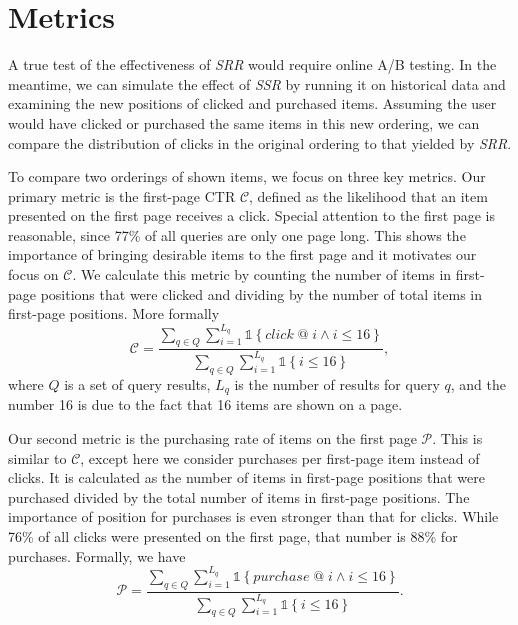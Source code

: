 \documentclass{article}
\begin{document}
\section{Metrics}

A true test of the effectiveness of {\em SRR} would require online A/B
testing. In the meantime, we can simulate the effect of {\em SSR} by running it
on historical data and examining the new positions of clicked and purchased items.
Assuming the user would have clicked or purchased the same items in this new ordering, 
we can compare the distribution of clicks in the original ordering to that yielded 
by {\em SRR}.

To compare two orderings of shown items, we focus on three key metrics. Our primary 
metric is the first-page CTR $\mathscr{C}$, defined as the likelihood that an item 
presented on the first page receives a click. Special attention to the first page is
reasonable, since 77\% of all queries 
are only one page long. This shows the importance of bringing desirable items to the 
first page and it motivates our focus on $\mathscr{C}$. We calculate this metric by 
counting the number of items in first-page positions that were clicked and dividing 
by the number of total items in first-page positions. More formally
\begin{equation}
    \mathscr{C} = \frac{\sum_{q \in Q}\sum_{i=1}^{L_q}\mathds{1}\left\{click\; @\; i \wedge i \leq 16\right\}}{\sum_{q \in Q}\sum_{i=1}^{L_q}\mathds{1}\left\{i \leq 16\right\}},
\end{equation}
where $Q$ is a set of query results, $L_q$ is the number of results for query $q$, and
the number 16 is due to the fact that 16 items are shown on a page.

Our second metric is the purchasing rate of items on the first page $\mathscr{P}$. This is 
similar to $\mathscr{C}$, except here we consider purchases per first-page item 
instead of clicks. It is calculated as the number of items in first-page positions that 
were purchased divided by the total number of items in first-page positions. The 
importance of position for purchases is even stronger than that for clicks. While 76\% of 
all clicks were presented on the first page, that number is 88\% for purchases. Formally,
we have
\begin{equation}
    \mathscr{P} = \frac{\sum_{q \in Q}\sum_{i=1}^{L_q}\mathds{1}\left\{purchase\; @\; i \wedge i \leq 16\right\}}{\sum_{q \in Q}\sum_{i=1}^{L_q}\mathds{1}\left\{i \leq 16\right\}}.
\end{equation}
\end{document}
